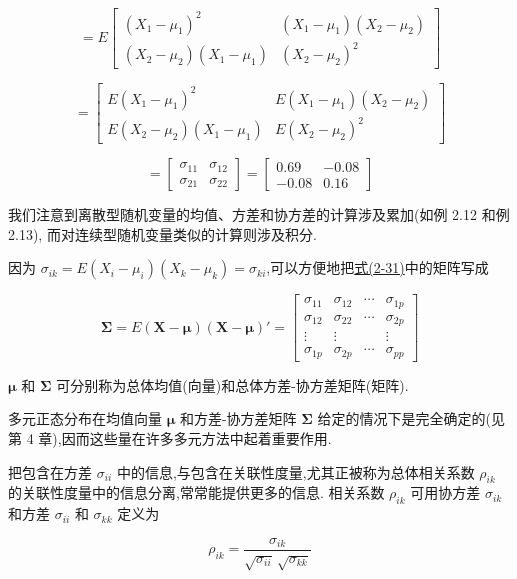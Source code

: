 
\[
=E\begin{bmatrix}
(X_1-\mu_1)^2 & (X_1-\mu_1)(X_2-\mu_2)\\
(X_2-\mu_2)(X_1-\mu_1) & (X_2-\mu_2)^2
\end{bmatrix}
\]

\[
=\begin{bmatrix}
E(X_1-\mu_1)^2 & E(X_1-\mu_1)(X_2-\mu_2)\\
E(X_2-\mu_2)(X_1-\mu_1) & E(X_2-\mu_2)^2
\end{bmatrix}
\]

\[
=\begin{bmatrix}\sigma_{11} & \sigma_{12}\\\sigma_{21} & \sigma_{22}\end{bmatrix}=\begin{bmatrix}0.69 & -0.08\\-0.08 & 0.16\end{bmatrix}
\]

我们注意到离散型随机变量的均值、方差和协方差的计算涉及累加(如例 2.12 和例 2.13),
而对连续型随机变量类似的计算则涉及积分.

因为 $\sigma_{ik}=E(X_i-\mu_i)(X_k-\mu_k)=\sigma_{ki}$,可以方便地把\hyperref[eq:2-31]{式(2-31)}中的矩阵写成

\label{eq:2-32}
\begin{equation}
\bm{\Sigma}=E(\bm{X}-\bm{\mu})(\bm{X}-\bm{\mu})'=\begin{bmatrix}
\sigma_{11} & \sigma_{12} & \cdots & \sigma_{1p}\\
\sigma_{12} & \sigma_{22} & \cdots & \sigma_{2p}\\
\vdots & \vdots & & \vdots\\
\sigma_{1p} & \sigma_{2p} & \cdots & \sigma_{pp}
\end{bmatrix} \tag{2-32}
\end{equation}

$\bm{\mu}$ 和 $\bm{\Sigma}$ 可分别称为总体均值(向量)和总体方差-协方差矩阵(矩阵).

多元正态分布在均值向量 $\bm{\mu}$ 和方差-协方差矩阵 $\bm{\Sigma}$ 给定的情况下是完全确定的(见第 4 章),因而这些量在许多多元方法中起着重要作用.

把包含在方差 $\sigma_{ii}$ 中的信息,与包含在关联性度量,尤其正被称为总体相关系数 $\rho_{ik}$ 的关联性度量中的信息分离,常常能提供更多的信息. 相关系数 $\rho_{ik}$ 可用协方差 $\sigma_{ik}$ 和方差 $\sigma_{ii}$ 和 $\sigma_{kk}$ 定义为

\label{eq:2-33}
\begin{equation}
\rho_{ik}=\frac{\sigma_{ik}}{\sqrt{\sigma_{ii}}\,\sqrt{\sigma_{kk}}} \tag{2-33}
\end{equation}

